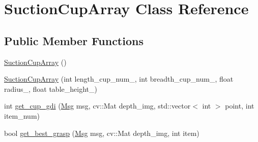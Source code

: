 \hypertarget{classSuctionCupArray}{}\section{Suction\+Cup\+Array Class Reference}
\label{classSuctionCupArray}
\subsection*{Public Member Functions}
\begin{DoxyCompactItemize}
\item 
\hyperlink{classSuctionCupArray_a33bbdfb41d4a5b5de459187ee800d317}{Suction\+Cup\+Array} ()
\item 
\hyperlink{classSuctionCupArray_adc7c28d5922124c15c8b31b4ac391879}{Suction\+Cup\+Array} (int length\+\_\+cup\+\_\+num\+\_\+, int breadth\+\_\+cup\+\_\+num\+\_\+, float radius\+\_\+, float table\+\_\+height\+\_\+)
\item 
int \hyperlink{classSuctionCupArray_ae7cb79c848f3067b11cfc98751e143a4}{get\+\_\+cup\+\_\+gdi} (\hyperlink{classMsg}{Msg} msg, cv\+::\+Mat depth\+\_\+img, std\+::vector$<$ int $>$ point, int item\+\_\+num)
\item 
bool \hyperlink{classSuctionCupArray_a342e3be05d1d154a6d7ae1c3564db2d5}{get\+\_\+best\+\_\+grasp} (\hyperlink{classMsg}{Msg} msg, cv\+::\+Mat depth\+\_\+img, int item)
\end{DoxyCompactItemize}
